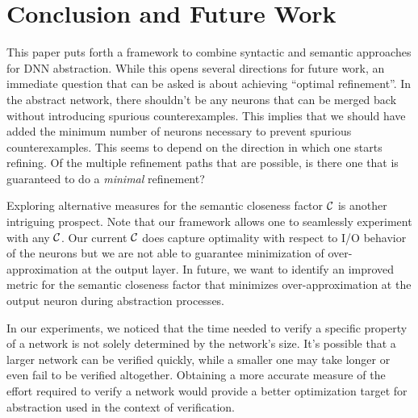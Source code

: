 \section{Conclusion and Future Work}

This paper puts forth a framework to combine syntactic and semantic approaches
for DNN abstraction. While this opens several directions for future work, an
immediate question that can be asked is about achieving ``optimal refinement''.
In the abstract network, there shouldn't be any neurons that can be merged back
without introducing spurious counterexamples. This implies that we should have
added the minimum number of neurons necessary to prevent spurious
counterexamples. This seems to depend on the direction in which one starts
refining. Of the multiple refinement paths that are possible, is there one that
is guaranteed to do a \emph{minimal} refinement?

Exploring alternative measures for the semantic closeness factor $\mathcal{C}$ is
another intriguing prospect. Note that our framework allows one to seamlessly
experiment  with any $\mathcal{C}$.  Our current $\mathcal{C}$ does capture optimality with
respect to I/O behavior of the neurons but we are not able to guarantee
minimization of over-approximation at the output layer. In future, we want to
identify an improved metric for the semantic closeness factor that minimizes
over-approximation at the output neuron during abstraction processes. 

In our experiments, we noticed that the time needed to verify a specific
property of a network is not solely determined by the network's size. It's
possible that a larger network can be verified quickly, while a smaller one may
take longer or even fail to be verified altogether. Obtaining a more accurate
measure of the effort required to verify a network would provide a better
optimization target for abstraction used in the context of verification.



